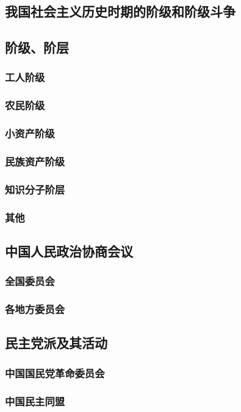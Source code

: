 \documentclass[UTF8]{../RepresentationUniverse}
\begin{document}
\subsection{我国社会主义历史时期的阶级和阶级斗争}
\subsection{阶级、阶层}
    \subsubsection{工人阶级}
    \subsubsection{农民阶级}
    \subsubsection{小资产阶级}
    \subsubsection{民族资产阶级}
    \subsubsection{知识分子阶层}
    \subsubsection{其他}

\subsection{中国人民政治协商会议}
    \subsubsection{全国委员会}
    \subsubsection{各地方委员会}

\subsection{民主党派及其活动}
    \subsubsection{中国国民党革命委员会}
    \subsubsection{中国民主同盟}
\end{document}
